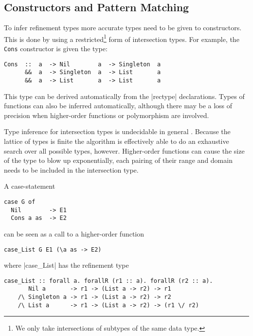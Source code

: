 \subsection{Constructors and Pattern Matching}

To infer refinement types more accurate types need to be given to constructors. This is done by using a restricted\footnote{We only take intersections of subtypes of the same data type.} form of intersection types. For example, the {\tt Cons} constructor is given the type:

\begin{verbatim}
Cons  ::  a  -> Nil        a  -> Singleton  a
      &&  a  -> Singleton  a  -> List       a
      &&  a  -> List       a  -> List       a
\end{verbatim}

This type can be derived automatically from the |rectype| declarations. Types of functions can also be inferred automatically, although there may be a loss of precision when higher-order functions or polymorphism are involved.

Type inference for intersection types is undecidable in general \cite{Pierce91programmingwith,Reynolds96designof}. Because the lattice of types is finite the algorithm is effectively able to do an exhaustive search over all possible types, however. Higher-order functions can cause the size of the type to blow up exponentially, each pairing of their range and domain needs to be included in the intersection type.

A case-statement 

\begin{verbatim}
case G of
  Nil        -> E1
  Cons a as  -> E2
\end{verbatim}

can be seen as a call to a higher-order function

\begin{verbatim}
case_List G E1 (\a as -> E2)
\end{verbatim}

where |case_List| has the refinement type

\begin{verbatim}
case_List :: forall a. forallR (r1 :: a). forallR (r2 :: a).
       Nil a       -> r1 -> (List a -> r2) -> r1
    /\ Singleton a -> r1 -> (List a -> r2) -> r2
    /\ List a      -> r1 -> (List a -> r2) -> (r1 \/ r2)
\end{verbatim}


